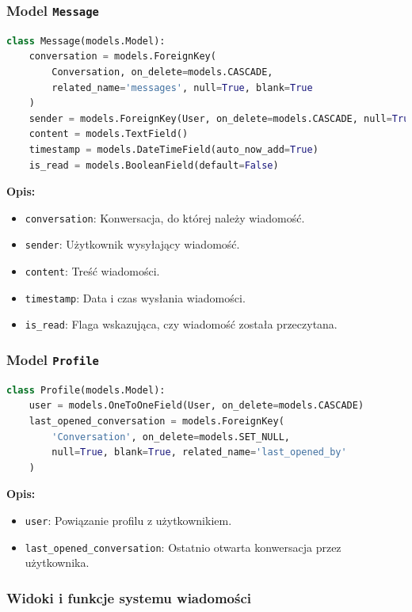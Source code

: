 \documentclass[12pt,a4paper,oneside]{article}
\theoremstyle{definition}
\numberwithin{equation}{section}
\begin{document}
\subsubsection*{Model \texttt{Message}}
\begin{lstlisting}[language=Python, caption=Model \texttt{Message}]
class Message(models.Model):
    conversation = models.ForeignKey(
        Conversation, on_delete=models.CASCADE,
        related_name='messages', null=True, blank=True
    )
    sender = models.ForeignKey(User, on_delete=models.CASCADE, null=True)
    content = models.TextField()
    timestamp = models.DateTimeField(auto_now_add=True)
    is_read = models.BooleanField(default=False)
\end{lstlisting}
\textbf{Opis:}
\begin{itemize}
    \item \texttt{conversation}: Konwersacja, do której należy wiadomość.
    \item \texttt{sender}: Użytkownik wysyłający wiadomość.
    \item \texttt{content}: Treść wiadomości.
    \item \texttt{timestamp}: Data i czas wysłania wiadomości.
    \item \texttt{is\_read}: Flaga wskazująca, czy wiadomość została przeczytana.
\end{itemize}


\subsubsection*{Model \texttt{Profile}}
\begin{lstlisting}[language=Python, caption=Model \texttt{Profile}]
class Profile(models.Model):
    user = models.OneToOneField(User, on_delete=models.CASCADE)
    last_opened_conversation = models.ForeignKey(
        'Conversation', on_delete=models.SET_NULL,
        null=True, blank=True, related_name='last_opened_by'
    )
\end{lstlisting}
\textbf{Opis:}
\begin{itemize}
    \item \texttt{user}: Powiązanie profilu z użytkownikiem.
    \item \texttt{last\_opened\_conversation}: Ostatnio otwarta konwersacja przez użytkownika.
\end{itemize}



\subsubsection{Widoki i funkcje systemu wiadomości}
\end{document}
